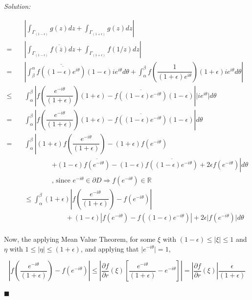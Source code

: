 \documentclass[12pt]{article}
\newcommand{\R}{\mathbb{R}}
\theoremstyle{definition}
\newenvironment{answer}{\textit{Solution: }\quad }{ \hfill $\blacksquare$}
\numberwithin{equation}{section}
\begin{document}
\begin{answer}
\begin{enumerate}
\begin{enumerate}
			\begin{align*}
				& \left\vert \int_{\Gamma_{(1 - \epsilon)}} g(z)dz + \int_{\Gamma_{(1 + \epsilon)}} g(z)dz \right\vert\\
				= \quad & \left\vert \int_{\Gamma_{(1 - \epsilon)}} \overline{f(\overline{z})} dz + \int_{\Gamma_{(1 + \epsilon)}} f(1/z)dz \right\vert \\
				= \quad & \left\vert \int_{\beta}^{\alpha} \overline{f(\overline{(1-\epsilon)e^{i\theta}} )} (1-\epsilon)i e^{i\theta}d\theta + \int_{\alpha}^{\beta} f\left( \dfrac{1}{(1+\epsilon) e^{i\theta}}\right)(1 + \epsilon)ie^{i\theta}d\theta \right\vert\\
				\leq \quad & \int_{\alpha}^{\beta} \left\vert f\left( \dfrac{e^{-i\theta}}{(1 + \epsilon)} \right) (1+\epsilon) - \overline{f((1-\epsilon) e^{-i\theta})}(1 - \epsilon) \right\vert \vert i e^{i\theta} \vert d\theta\\
				= \quad & \int_{\alpha}^{\beta} \left\vert f\left( \dfrac{e^{-i\theta}}{(1 + \epsilon)} \right) (1+\epsilon) - \overline{f((1-\epsilon) e^{-i\theta})}(1 - \epsilon) \right\vert d\theta\\
				= \quad & \int_{\alpha}^{\beta} \left\vert (1+\epsilon)f\left( \dfrac{e^{-i\theta}}{(1 + \epsilon)} \right) - (1 + \epsilon)f(e^{-i\theta}) \right. \\
				& \qquad \qquad \left. + (1 - \epsilon) \overline{f(e^{-i\theta})} - (1 - \epsilon) \overline{f((1-\epsilon) e^{-i\theta})} + 2\epsilon f(e^{-i\theta}) \right\vert d\theta\\
				& \qquad \qquad  \text{, since } e^{-i\theta} \in \partial D \Rightarrow f(e^{-i\theta}) \in \R\\
				& \leq \int_{\alpha}^{\beta} (1 + \epsilon)\left\vert f\left( \dfrac{e^{-i\theta}}{(1 + \epsilon)} \right) - f(e^{-i\theta}) \right\vert \\
				& \qquad \qquad \qquad + (1-\epsilon)\left\vert f(e^{-i\theta}) - f((1-\epsilon)e^{-i\theta}) \right\vert
				+ 2\epsilon \vert f(e^{-i\theta}) \vert d\theta\\
			\end{align*}

			Now, the applying Mean Value Theorem, for some $\xi$ with $(1 - \epsilon) \leq \vert \xi \vert \leq 1$ and $\eta$ with $1 \leq \vert \eta \vert \leq (1 + \epsilon)$, and applying that $\vert e^{-i\theta} \vert = 1$,

			$$
			\left\vert f\left( \dfrac{e^{-i\theta}}{(1 + \epsilon)} \right) - f(e^{-i\theta}) \right\vert \leq \left\vert \dfrac{\partial f}{\partial r}(\xi) \left[\dfrac{e^{-i\theta}}{(1 + \epsilon)} - e^{-i\theta}\right] \right\vert = \left\vert \dfrac{\partial f}{\partial r}(\xi)\right\vert \dfrac{\epsilon}{(1 + \epsilon)}
			$$


\end{enumerate}
\end{enumerate}
\end{answer}
\end{document}
